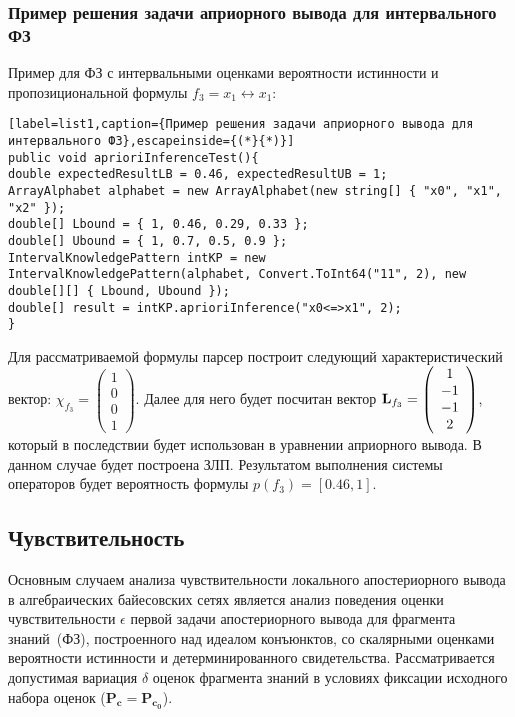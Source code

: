 \subsubsection{Пример решения задачи априорного вывода для интервального ФЗ}
Пример для ФЗ с интервальными оценками вероятности истинности и пропозициональной формулы $f_3 = x_1 \leftrightarrow x_1$:

\begin{lstlisting}[label=list1,caption={Пример решения задачи априорного вывода для интервального ФЗ},escapeinside={(*}{*)}]
public void aprioriInferenceTest(){
double expectedResultLB = 0.46, expectedResultUB = 1;
ArrayAlphabet alphabet = new ArrayAlphabet(new string[] { "x0", "x1", "x2" });
double[] Lbound = { 1, 0.46, 0.29, 0.33 };
double[] Ubound = { 1, 0.7, 0.5, 0.9 };
IntervalKnowledgePattern intKP = new IntervalKnowledgePattern(alphabet, Convert.ToInt64("11", 2), new double[][] { Lbound, Ubound });
double[] result = intKP.aprioriInference("x0<=>x1", 2); 
}
\end{lstlisting}


Для рассматриваемой формулы парсер построит следующий характеристический вектор: $\chi_{f_3} = \left( \begin{array}{c}
1\\
0\\
0 \\
1
\end{array}  \right)$. Далее для него будет посчитан вектор ${\bf L}_{f_3} = \left( \begin{array}{c}
1\\
-1\\
-1 \\
2
\end{array}  \right)$, который в последствии будет использован в уравнении априорного вывода. В данном случае будет построена ЗЛП. Результатом выполнения системы операторов будет вероятность формулы $p(f_3) = [0.46, 1]$.




\subsection{Чувствительность}
Основным случаем анализа чувствительности локального апостериорного вывода в алгебраических байесовских сетях является анализ поведения оценки чувствительности $\epsilon$ первой задачи апостериорного вывода для фрагмента знаний~(ФЗ), построенного над идеалом конъюнктов, со скалярными оценками вероятности истинности и детерминированного свидетельства. Рассматривается допустимая вариация $\delta$ оценок фрагмента знаний в условиях фиксации исходного набора оценок ($\mathbf{P_{c}} = \mathbf{P_{c_0}}$).

